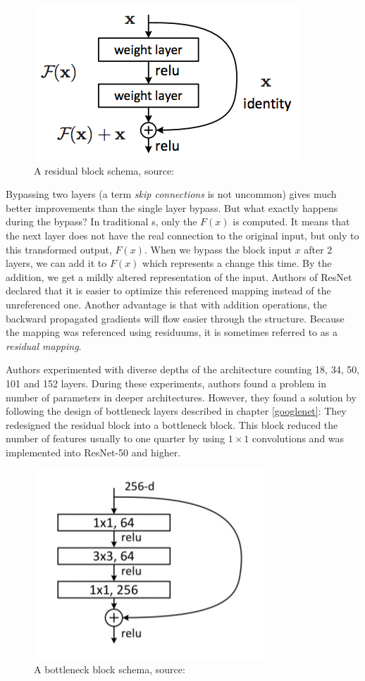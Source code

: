 \begin{figure}[H]
   \centering
	\includegraphics[width=0.4\linewidth]{./pictures/residual-block.png}
	\caption[Residual block]{A residual block schema, source: \cite{resnet}}
      \label{fig:res-block}
\end{figure}

Bypassing two layers (a term \textit{skip connections} is not uncommon) gives 
much better improvements than the single layer bypass. But what exactly happens 
during the bypass? In traditional s, only the $F(x)$ is computed. It 
means that the next layer does not have the real connection to the original 
input, but only to this transformed output, $F(x)$. When we bypass the block 
input $x$ after 2 layers, we can add it to $F(x)$ which represents a change this 
time. By the addition, we get a mildly altered representation of the input. 
Authors of ResNet declared that it is easier to optimize this referenced mapping 
instead of the unreferenced one. Another advantage is that with addition 
operations, the backward propagated gradients will flow easier through the 
structure. Because the mapping was referenced using residuums, it is sometimes 
referred to as a \textit{residual mapping}.

Authors experimented with diverse depths of the architecture counting 18, 34, 
50, 101 and 152 layers. During these experiments, authors found a problem in 
number of parameters in deeper architectures. However, they found a solution by 
following the design of bottleneck layers described in chapter \ref{googlenet}: 
They redesigned the residual block into a bottleneck block. This block reduced 
the number of features usually to one quarter by using $1 \times 1$ convolutions 
and was implemented into ResNet-50 and higher.

\begin{figure}[H]
   \centering
	\includegraphics[width=0.4\linewidth]{./pictures/bottleneck-block.jpg}
	\caption[Bottleneck block]{A bottleneck block schema, source: \cite{resnet}}
      \label{fig:bottleneck-block}
\end{figure}

